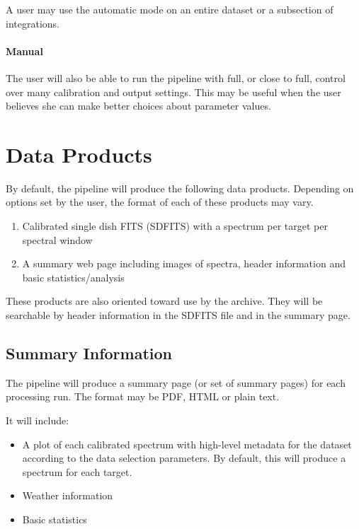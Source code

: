 A user may use the automatic mode on an entire dataset or a subsection of integrations.

\paragraph{Manual}

The user will also be able to run the pipeline with full, or close to full, control over many calibration and output settings.  This may be useful when the user believes she can make better choices about parameter values.

\section{Data Products}

By default, the pipeline will produce the following data products.  Depending on options set by the user, the format of each of these products may vary.
\begin{enumerate}
\item Calibrated single dish FITS (SDFITS) with a spectrum per target per spectral window
\item A summary web page including images of spectra, header information and basic statistics/analysis
\end{enumerate}

These products are also oriented toward use by the archive.  They will be searchable by header information in the SDFITS file and in the summary page.

\subsection{Summary Information}

The pipeline will produce a summary page (or set of summary pages) for each processing run.  The format may be PDF, HTML or plain text.

It will include:
\begin{itemize}
\item A plot of each calibrated spectrum with high-level metadata for the dataset according to the data selection parameters.  By default, this will produce a spectrum for each target.
\item Weather information
\item Basic statistics
\end{itemize}

